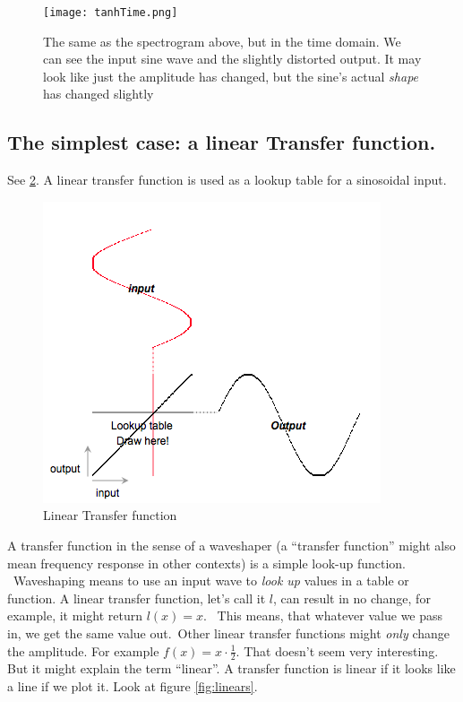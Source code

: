 \begin{figure}[h!]
	\centering
	\texttt{[image: tanhTime.png]}
	\caption[Distorted sine, time domain]
	{The same as the spectrogram above, but in the time domain. We can see the input sine wave and the slightly distorted output. It may look like just the amplitude has changed, but the sine's actual \textit{shape} has changed slightly}
	\label{fig:tanhTimeDom}
\end{figure}

\subsection{The simplest case: a linear Transfer function. } %
\label{sub:linearTrans}
See \ref{fig:linfunct}. A linear transfer function is used as a lookup table for a sinosoidal input.

\begin{figure}[H]
	\begin{center}
		\includegraphics[scale = 1]{img/waveShapingVisual.png}
		\caption{Linear Transfer function}
		\label{fig:linfunct}
	\end{center}
\end{figure}
A transfer function in the sense of a waveshaper (a ``transfer function'' might also mean frequency response in other contexts) is a simple look-up function. \
Waveshaping means to use an input wave to \textit{look up} values in a table or function. A linear transfer function, let's call it $l$, can result in no change, for example, it might return $l(x)=x$. \
This means, that whatever value we pass in, we get the same value out.\
Other linear transfer functions might \textit{only} change the amplitude. For example $f(x)=x \cdot \frac{1}{2}$. That doesn't seem very interesting. But it might explain the term ``linear''. A transfer function is linear if it looks like a line if we plot it. Look at figure \ref{fig:linears}.

